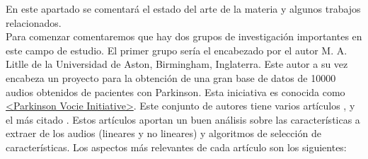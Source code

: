 \label{cap:TrabRel}

En este apartado se comentará el estado del arte de la materia y algunos trabajos relacionados.\\

Para comenzar comentaremos que hay dos grupos de investigación importantes en este campo de estudio. El primer grupo sería el encabezado por el autor M. A. Litlle de la Universidad de Aston, Birmingham, Inglaterra. Este autor a su vez encabeza un proyecto para la obtención de una gran base de datos de 10000 audios obtenidos de pacientes con Parkinson. Esta iniciativa es conocida como \href{http://www.parkinsonsvoice.org/}{<Parkinson Vocie Initiative>}. Este conjunto de autores tiene varios artículos \cite{MxLtAccurate}, \cite{MxLtNovel} y el más citado \cite{MxLtSuitability}. Estos artículos aportan un buen análisis sobre las características a extraer de los audios (lineares y no lineares) y algoritmos de selección de características. Los aspectos más relevantes de cada artículo son los siguientes:
